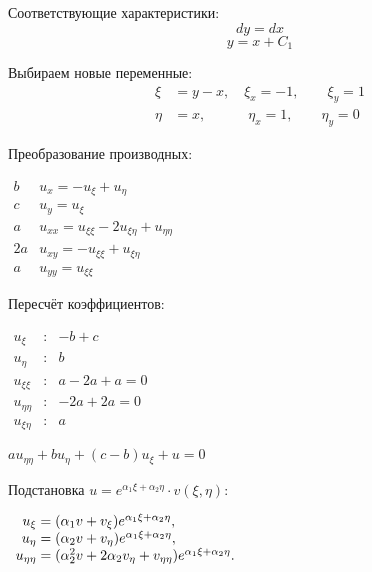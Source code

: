 \documentclass[a4paper,12pt]{article}
\begin{document}
Соответствующие характеристики:
\begin{equation*}
    dy = dx
\end{equation*}
\begin{equation*}
    y = x + C_1
\end{equation*}

Выбираем новые переменные:
\begin{align*}
    \xi &= y - x,   \quad \xi_x = -1, \quad \quad \xi_y = 1 \\
    \eta &= x, \quad \quad \quad \eta_x = 1, \quad \quad \eta_y = 0
\end{align*}

Преобразование производных:
\begin{flushleft}
\(
\begin{array}{r|l}
b & u_x = - u_{\xi} + u_{\eta} \\
c & u_y = u_{\xi} \\
a & u_{xx} = u_{\xi\xi} - 2 u_{\xi\eta} + u_{\eta\eta} \\
2a & u_{xy} = - u_{\xi\xi} + u_{\xi\eta} \\
a & u_{yy} = u_{\xi\xi}
\end{array}
\)
\end{flushleft}

Пересчёт коэффициентов:
\begin{flushleft}
\(
\begin{array}{rcl}
    u_{\xi} &:& -b + c \\
    u_{\eta} &:& b \\
    u_{\xi\xi} &:& a - 2a + a = 0 \\
    u_{\eta\eta} &:& -2a + 2a = 0 \\
    u_{\xi\eta} &:& a
\end{array}
\)
\end{flushleft}

$ au_{\eta\eta} + bu_{\eta} + (c-b)u_{\xi}+u=0$

\vspace{2mm}
Подстановка $ u = e^{\alpha_1 \xi + \alpha_2 \eta} \cdot v(\xi, \eta) $:
\begin{flushleft}
\(
\begin{array}{r@{}l}
    u_{\xi} &{}= (\alpha_1 v + v_{\xi}) e^{\alpha_1 \xi + \alpha_2 \eta}, \\
    u_{\eta} &{}= (\alpha_2 v + v_{\eta}) e^{\alpha_1 \xi + \alpha_2 \eta}, \\
    u_{\eta\eta} &{}= (\alpha_2^2 v + 2\alpha_2 v_{\eta} + v_{\eta\eta}) e^{\alpha_1 \xi + \alpha_2 \eta}.
\end{array}
\)
\end{flushleft}
\end{document}
